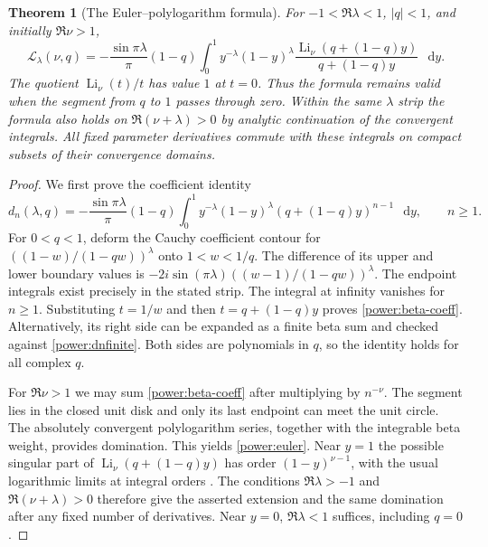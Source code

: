 \documentclass[11pt,a4paper]{article}
\numberwithin{equation}{section}
\newtheorem{theorem}{Theorem}[section]
\theoremstyle{definition}
\theoremstyle{remark}
\DeclareMathOperator{\Li}{Li}
\newcommand{\dd}{\mathop{}\!\mathrm{d}}
\begin{document}
\begin{theorem}[The Euler--polylogarithm formula]\label{power:eulerthm}
For $-1<\Re\lambda<1$, $|q|<1$, and initially $\Re\nu>1$,
\begin{equation}\label{power:euler}
 \boxed{\displaystyle
 \mathcal L_\lambda(\nu,q)=
 -\frac{\sin\pi\lambda}{\pi}(1-q)
 \int_0^1 y^{-\lambda}(1-y)^\lambda
       \frac{\Li_\nu(q+(1-q)y)}{q+(1-q)y}\,\dd y.}
\end{equation}
The quotient $\Li_\nu(t)/t$ has value $1$ at $t=0$.  Thus the
formula remains valid when the segment from $q$ to $1$ passes through
zero.  Within the same $\lambda$ strip the formula also holds on
$\Re(\nu+\lambda)>0$ by analytic continuation of the convergent
integrals.  All fixed parameter derivatives commute with these integrals
on compact subsets of their convergence domains.
\end{theorem}

\begin{proof}
We first prove the coefficient identity
\begin{equation}\label{power:beta-coeff}
 d_n(\lambda,q)=-\frac{\sin\pi\lambda}{\pi}(1-q)
 \int_0^1y^{-\lambda}(1-y)^\lambda
                 (q+(1-q)y)^{n-1}\,\dd y,\qquad n\ge1.
\end{equation}
For $0<q<1$, deform the Cauchy coefficient contour for
$((1-w)/(1-qw))^\lambda$ onto $1<w<1/q$.  The difference of its
upper and lower boundary values is
$-2i\sin(\pi\lambda)((w-1)/(1-qw))^\lambda$.
The endpoint integrals exist precisely in the stated strip.  The
integral at infinity vanishes for $n\ge1$.  Substituting $t=1/w$
and then $t=q+(1-q)y$ proves \eqref{power:beta-coeff}.
Alternatively, its right side can be expanded as a finite beta sum
and checked against \eqref{power:dnfinite}.  Both sides are
polynomials in $q$, so the identity holds for all complex $q$.

For $\Re\nu>1$ we may sum \eqref{power:beta-coeff} after multiplying
by $n^{-\nu}$.  The segment lies in the closed unit disk and only
its last endpoint can meet the unit circle.  The absolutely convergent
polylogarithm series, together with the integrable beta weight, provides
domination.  This yields \eqref{power:euler}.  Near $y=1$ the possible
singular part of $\Li_\nu(q+(1-q)y)$ has order
$(1-y)^{\nu-1}$, with the usual logarithmic limits at integral
orders \cite[Eq.~25.12.12]{DLMF}.  The conditions
$\Re\lambda>-1$ and $\Re(\nu+\lambda)>0$ therefore give the
asserted extension and the same domination after any fixed number of
derivatives.  Near $y=0$, $\Re\lambda<1$ suffices, including $q=0$.
\end{proof}
\end{document}
